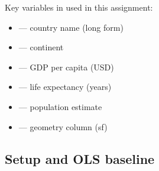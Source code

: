 Key variables in  used in this assignment:
\begin{itemize}
  \item {} --- country name (long form)
  \item {} --- continent
  \item {} --- GDP per capita (USD)
  \item {} --- life expectancy (years)
  \item {} --- population estimate
  \item {} --- geometry column (sf)
\end{itemize}

\subsection{Setup and OLS baseline}

